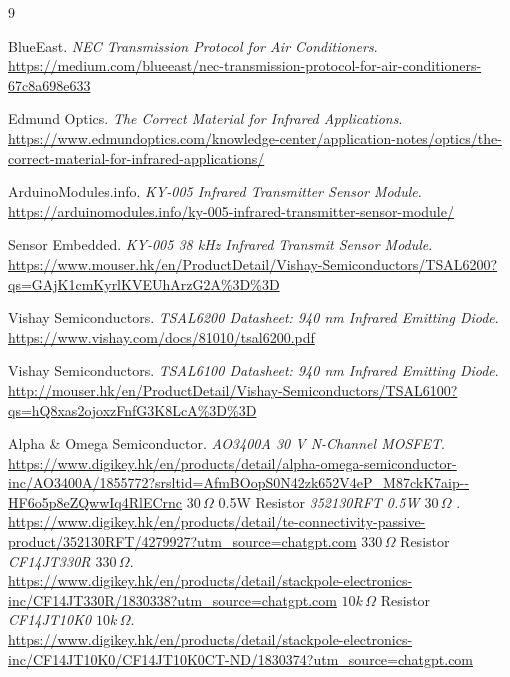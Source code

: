 \documentclass[a4paper,12pt]{article}
\begin{document}
\begin{thebibliography}{9}

BlueEast.
\emph{NEC Transmission Protocol for Air Conditioners}.
\\
\url{https://medium.com/blueeast/nec-transmission-protocol-for-air-conditioners-67c8a698e633}

Edmund Optics.
\emph{The Correct Material for Infrared Applications}.
\\
\url{https://www.edmundoptics.com/knowledge-center/application-notes/optics/the-correct-material-for-infrared-applications/}

ArduinoModules.info.
\emph{KY-005 Infrared Transmitter Sensor Module}.
\\
\url{https://arduinomodules.info/ky-005-infrared-transmitter-sensor-module/}

Sensor Embedded.
\emph{KY-005 38 kHz Infrared Transmit Sensor Module}.
\\
\url{https://www.mouser.hk/en/ProductDetail/Vishay-Semiconductors/TSAL6200?qs=GAjK1cmKyrlKVEUhArzG2A%3D%3D}

Vishay Semiconductors.
\emph{TSAL6200 Datasheet: 940 nm Infrared Emitting Diode}.
\\
\url{https://www.vishay.com/docs/81010/tsal6200.pdf}

Vishay Semiconductors.
\emph{TSAL6100 Datasheet: 940 nm Infrared Emitting Diode}.
\\
\url{http://mouser.hk/en/ProductDetail/Vishay-Semiconductors/TSAL6100?qs=hQ8xas2ojoxzFnfG3K8LcA%3D%3D}

Alpha \& Omega Semiconductor.
\emph{AO3400A 30 V N-Channel MOSFET}.
\\
\url{https://www.digikey.hk/en/products/detail/alpha-omega-semiconductor-inc/AO3400A/1855772?srsltid=AfmBOopS0N42zk652V4eP_M87ckK7aip--HF6o5p8eZQwwIq4RlECrnc}
\(30\,\Omega\) 0.5W Resistor
\emph{352130RFT 0.5W \(30\,\Omega\) }.
\\
\url{https://www.digikey.hk/en/products/detail/te-connectivity-passive-product/352130RFT/4279927?utm_source=chatgpt.com}
\(330\,\Omega\) Resistor 
\emph{CF14JT330R \(330\,\Omega\)}.
\\
\url{https://www.digikey.hk/en/products/detail/stackpole-electronics-inc/CF14JT330R/1830338?utm_source=chatgpt.com}
\(10k\,\Omega\) Resistor 
\emph{CF14JT10K0 \(10k\,\Omega\)}.
\\
\url{https://www.digikey.hk/en/products/detail/stackpole-electronics-inc/CF14JT10K0/CF14JT10K0CT-ND/1830374?utm_source=chatgpt.com}
\end{thebibliography}
\end{document}
